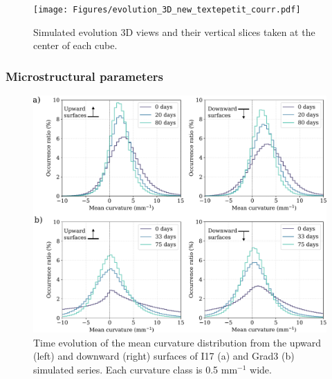 \documentclass[draft,ms]{agujournal2019}
\begin{document}
\begin{figure}
    \centering
    \texttt{[image: Figures/evolution\_3D\_new\_textepetit\_courr.pdf]}
    \caption{Simulated evolution 3D views and their vertical slices taken at the center of each cube.}
    \label{fig:evolutions_3D}
\end{figure}
\subsubsection{Microstructural parameters}
\begin{figure}
    \centering
    \includegraphics[width=\linewidth]{Figures/histo_i17_grad3.pdf}
    \caption{Time evolution of the mean curvature distribution from the upward (left) and downward (right) surfaces of I17 (a) and Grad3 (b) simulated series. Each curvature class is 0.5 mm$^{-1}$ wide.}
    \label{fig:histo_i17_grad3}
\end{figure}
\end{document}
